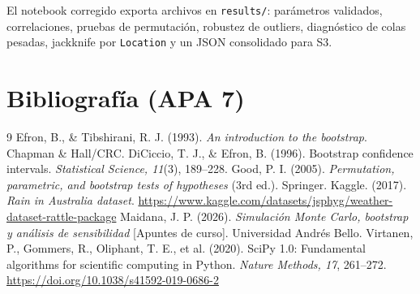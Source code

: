\documentclass[10pt,a4paper]{article}
\begin{document}
El notebook corregido exporta archivos en \texttt{results/}: parámetros validados, correlaciones, pruebas de permutación, robustez de outliers, diagnóstico de colas pesadas, jackknife por \texttt{Location} y un JSON consolidado para S3.

\clearpage
\section{Bibliografía (APA 7)}
\begin{thebibliography}{9}
 Efron, B., \& Tibshirani, R. J. (1993). \textit{An introduction to the bootstrap}. Chapman \& Hall/CRC.
 DiCiccio, T. J., \& Efron, B. (1996). Bootstrap confidence intervals. \textit{Statistical Science, 11}(3), 189--228.
 Good, P. I. (2005). \textit{Permutation, parametric, and bootstrap tests of hypotheses} (3rd ed.). Springer.
 Kaggle. (2017). \textit{Rain in Australia dataset}. \url{https://www.kaggle.com/datasets/jsphyg/weather-dataset-rattle-package}
 Maidana, J. P. (2026). \textit{Simulación Monte Carlo, bootstrap y análisis de sensibilidad} [Apuntes de curso]. Universidad Andrés Bello.
 Virtanen, P., Gommers, R., Oliphant, T. E., et al. (2020). SciPy 1.0: Fundamental algorithms for scientific computing in Python. \textit{Nature Methods, 17}, 261--272. \url{https://doi.org/10.1038/s41592-019-0686-2}
\end{thebibliography}
\end{document}
